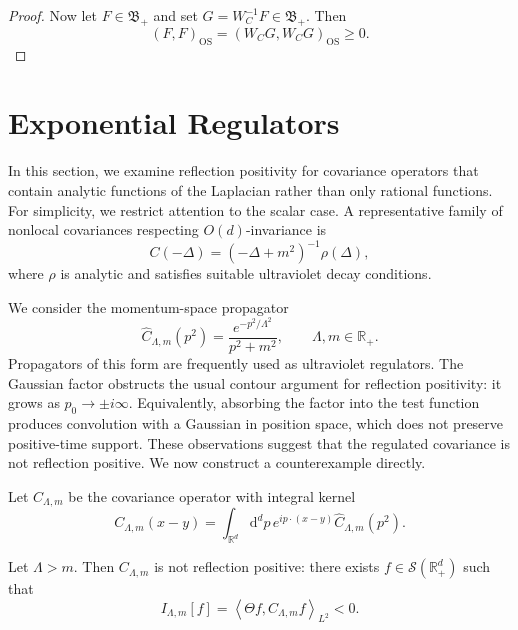 \documentclass[10pt,a4paper,oneside,reqno]{amsart}
\begin{document}
\begin{appendices}
\begin{proof}
Now let $F\in\mathfrak B_+$ and set $G=W_C^{-1}F\in\mathfrak B_+$. Then
\begin{equation}
  (F,F)_{\mathrm{OS}}
  =
  (W_CG,W_CG)_{\mathrm{OS}}
  \geq0.
\end{equation}
\end{proof}
\section{Exponential Regulators}
In this section, we examine reflection positivity for covariance operators that
contain analytic functions of the Laplacian rather than only rational functions.
For simplicity, we restrict attention to the scalar case. A representative
family of nonlocal covariances respecting $O(d)$-invariance is
\begin{equation}
  C(-\Delta)=(-\Delta+m^2)^{-1}\rho(\Delta),
\end{equation}
where \(\rho\) is analytic and satisfies suitable ultraviolet decay conditions.

We consider the momentum-space propagator
\begin{equation}
  \hat{C}_{\Lambda,m}(p^2)
  =
  \frac{e^{-p^2/\Lambda^2}}{p^2+m^2},
  \qquad \Lambda,m\in\mathbb R_+.
\end{equation}
Propagators of this form are frequently used as ultraviolet regulators. The
Gaussian factor obstructs the usual contour argument for reflection
positivity: it grows as \(p_0\to\pm i\infty\). Equivalently, absorbing the
factor into the test function produces convolution with a Gaussian in position
space, which does not preserve positive-time support. These observations
suggest that the regulated covariance is not reflection positive. We now
construct a counterexample directly.

Let \(C_{\Lambda,m}\) be the covariance operator with integral kernel
\begin{equation}
  C_{\Lambda,m}(x-y)
  =
  \int_{\mathbb R^d}\mathrm d^d p\,
  e^{ip\cdot(x-y)}\hat C_{\Lambda,m}(p^2).
\end{equation}

\begin{theorem}
  Let \(\Lambda>m\). Then \(C_{\Lambda,m}\) is not reflection positive: there
  exists \(f\in\mathcal S(\mathbb R_+^d)\) such that
  \begin{equation}
    I_{\Lambda,m}[f]
    =
    \left\langle\Theta f,C_{\Lambda,m}f\right\rangle_{L^2}
    <0.
  \end{equation}
\end{theorem}


\end{appendices}
\end{document}
